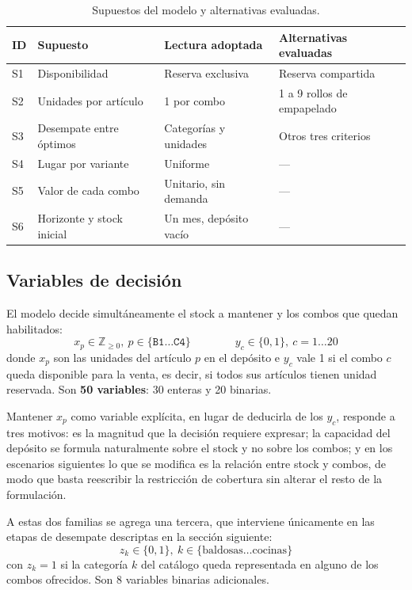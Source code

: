 \documentclass[10pt,a4paper]{article}
\newcommand{\art}[1]{\texttt{#1}}
\begin{document}
\begin{table}[H]
\centering\small
\caption{Supuestos del modelo y alternativas evaluadas.}
\label{tab:supuestos}
\begin{tabularx}{\linewidth}{@{}llXl@{}}
\toprule
\textbf{ID} & \textbf{Supuesto} & \textbf{Lectura adoptada} & \textbf{Alternativas evaluadas} \\
\midrule
S1 & Disponibilidad         & Reserva exclusiva      & Reserva compartida \\
S2 & Unidades por artículo  & 1 por combo            & 1 a 9 rollos de empapelado \\
S3 & Desempate entre óptimos & Categorías y unidades & Otros tres criterios \\
S4 & Lugar por variante     & Uniforme               & --- \\
S5 & Valor de cada combo    & Unitario, sin demanda  & --- \\
S6 & Horizonte y stock inicial & Un mes, depósito vacío & --- \\
\bottomrule
\end{tabularx}
\end{table}

\subsection{Variables de decisión}
\label{sec:variables}

El modelo decide simultáneamente el stock a mantener y los combos que quedan
habilitados:
\[
x_p \in \mathbb{Z}_{\geq 0},\ p \in \{\art{B1}\dots\art{C4}\}
\qquad\qquad
y_c \in \{0,1\},\ c = 1\dots 20
\]
donde $x_p$ son las unidades del artículo $p$ en el depósito e $y_c$ vale 1 si
el combo $c$ queda disponible para la venta, es decir, si todos sus artículos
tienen unidad reservada. Son \textbf{50 variables}: 30 enteras y 20 binarias.

Mantener $x_p$ como variable explícita, en lugar de deducirla de los $y_c$,
responde a tres motivos: es la magnitud que la decisión requiere expresar; la
capacidad del depósito se formula naturalmente sobre el stock y no sobre los
combos; y en los escenarios siguientes lo que se modifica es la relación entre
stock y combos, de modo que basta reescribir la restricción de cobertura sin
alterar el resto de la formulación.

A estas dos familias se agrega una tercera, que interviene únicamente en las
etapas de desempate descriptas en la sección siguiente:
\[
z_k \in \{0,1\},\ k \in \{\text{baldosas}\dots\text{cocinas}\}
\]
con $z_k = 1$ si la categoría $k$ del catálogo queda representada en alguno de
los combos ofrecidos. Son 8 variables binarias adicionales.
\end{document}
